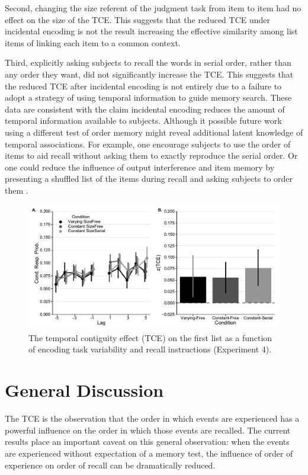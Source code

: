 \documentclass[man,natbib,floatsintext]{apa6} %
\begin{document}
Second, changing the size referent of the judgment task from item to item had no effect on the size of the TCE. This suggests that the reduced TCE under incidental encoding is not the result increasing the effective similarity among list items of linking each item to a common context. 

Third, explicitly asking subjects to recall the words in serial order, rather than any order they want, did not significantly increase the TCE. This suggests that the reduced TCE after incidental encoding is not entirely due to a failure to adopt a strategy of using temporal information to guide memory search. These data are consistent with the claim incidental encoding reduces the amount of temporal information available to subjects. Although it possible future work using a different test of order memory might reveal additional latent knowledge of temporal associations. For example, one encourage subjects to use the order of items to aid recall without asking them to exactly reproduce the serial order. Or one could reduce the influence of output interference and item memory by presenting a shuffled list of the items during recall and asking subjects to order them \citep[e.g.,][]{NairEtal17}.


\begin{figure}%
\includegraphics{figures/E4_crp_list1.pdf}
\caption{The temporal contiguity effect (TCE) on the first list as a function of encoding task variability and recall instructions (Experiment 4). \paneltext}
\label{E4_crp_list1}
\end{figure}

\color{black}





\section{General Discussion}
\color{red}
The TCE is the observation that the order in which events are experienced has a powerful influence on the order in which those events are recalled. The current results place an important caveat on this general observation: when the events are experienced without expectation of a memory test, the influence of order of experience on order of recall can be dramatically reduced.  
\end{document}

